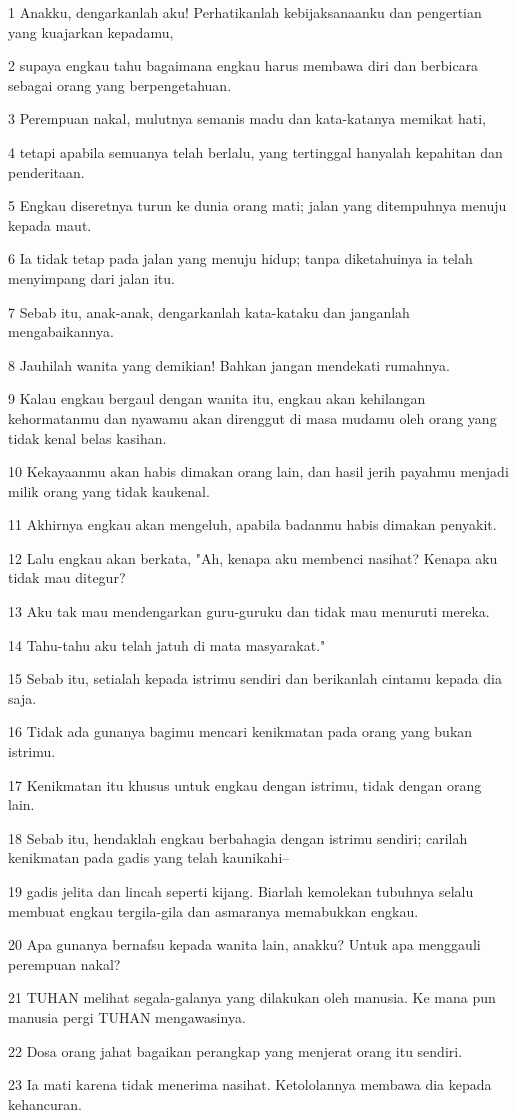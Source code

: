 \par 1 Anakku, dengarkanlah aku! Perhatikanlah kebijaksanaanku dan pengertian yang kuajarkan kepadamu,
\par 2 supaya engkau tahu bagaimana engkau harus membawa diri dan berbicara sebagai orang yang berpengetahuan.
\par 3 Perempuan nakal, mulutnya semanis madu dan kata-katanya memikat hati,
\par 4 tetapi apabila semuanya telah berlalu, yang tertinggal hanyalah kepahitan dan penderitaan.
\par 5 Engkau diseretnya turun ke dunia orang mati; jalan yang ditempuhnya menuju kepada maut.
\par 6 Ia tidak tetap pada jalan yang menuju hidup; tanpa diketahuinya ia telah menyimpang dari jalan itu.
\par 7 Sebab itu, anak-anak, dengarkanlah kata-kataku dan janganlah mengabaikannya.
\par 8 Jauhilah wanita yang demikian! Bahkan jangan mendekati rumahnya.
\par 9 Kalau engkau bergaul dengan wanita itu, engkau akan kehilangan kehormatanmu dan nyawamu akan direnggut di masa mudamu oleh orang yang tidak kenal belas kasihan.
\par 10 Kekayaanmu akan habis dimakan orang lain, dan hasil jerih payahmu menjadi milik orang yang tidak kaukenal.
\par 11 Akhirnya engkau akan mengeluh, apabila badanmu habis dimakan penyakit.
\par 12 Lalu engkau akan berkata, "Ah, kenapa aku membenci nasihat? Kenapa aku tidak mau ditegur?
\par 13 Aku tak mau mendengarkan guru-guruku dan tidak mau menuruti mereka.
\par 14 Tahu-tahu aku telah jatuh di mata masyarakat."
\par 15 Sebab itu, setialah kepada istrimu sendiri dan berikanlah cintamu kepada dia saja.
\par 16 Tidak ada gunanya bagimu mencari kenikmatan pada orang yang bukan istrimu.
\par 17 Kenikmatan itu khusus untuk engkau dengan istrimu, tidak dengan orang lain.
\par 18 Sebab itu, hendaklah engkau berbahagia dengan istrimu sendiri; carilah kenikmatan pada gadis yang telah kaunikahi--
\par 19 gadis jelita dan lincah seperti kijang. Biarlah kemolekan tubuhnya selalu membuat engkau tergila-gila dan asmaranya memabukkan engkau.
\par 20 Apa gunanya bernafsu kepada wanita lain, anakku? Untuk apa menggauli perempuan nakal?
\par 21 TUHAN melihat segala-galanya yang dilakukan oleh manusia. Ke mana pun manusia pergi TUHAN mengawasinya.
\par 22 Dosa orang jahat bagaikan perangkap yang menjerat orang itu sendiri.
\par 23 Ia mati karena tidak menerima nasihat. Ketololannya membawa dia kepada kehancuran.

